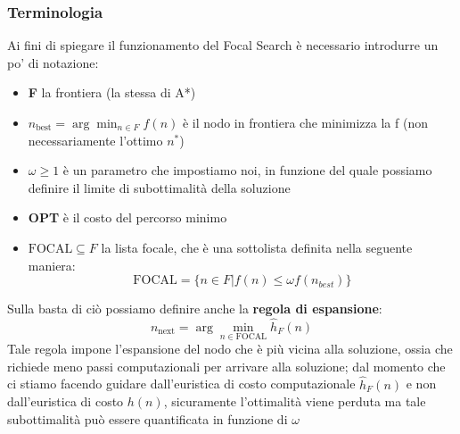 \subsubsection{Terminologia}
Ai fini di spiegare il funzionamento del Focal Search è necessario introdurre un po' di notazione:
\begin{itemize}
    \item \textbf{F} la frontiera (la stessa di A*)
    \item $n_{\mbox{best}} = \arg \min_{n \in F} f(n)$ è il nodo in frontiera che minimizza la f (non necessariamente l'ottimo $n^*$)
    \item $\omega \geq 1$ è un parametro che impostiamo noi, in funzione del quale possiamo definire il limite di subottimalità della soluzione
    \item \textbf{OPT} è il costo del percorso minimo
    \item $\mbox{FOCAL} \subseteq F$ la lista focale, che è una sottolista definita nella seguente maniera:
    \begin{equation*}
        \mbox{FOCAL} = \{n \in F | f(n) \leq \omega f(n_{best})\}
    \end{equation*}
\end{itemize}
Sulla basta di ciò possiamo definire anche la \textbf{regola di espansione}:\\
\begin{equation*}
    n_{\mbox{next}} = \arg \min_{n \in \mbox{FOCAL}} \hat{h}_F (n)
\end{equation*}
Tale regola impone l'espansione del nodo che è più vicina alla soluzione, ossia che richiede meno passi computazionali per arrivare alla soluzione;
dal momento che ci stiamo facendo guidare dall'euristica di costo computazionale $\hat{h}_F (n)$ e non dall'euristica di costo $h(n)$, sicuramente l'ottimalità viene perduta
ma tale subottimalità può essere quantificata in funzione di $\omega$

